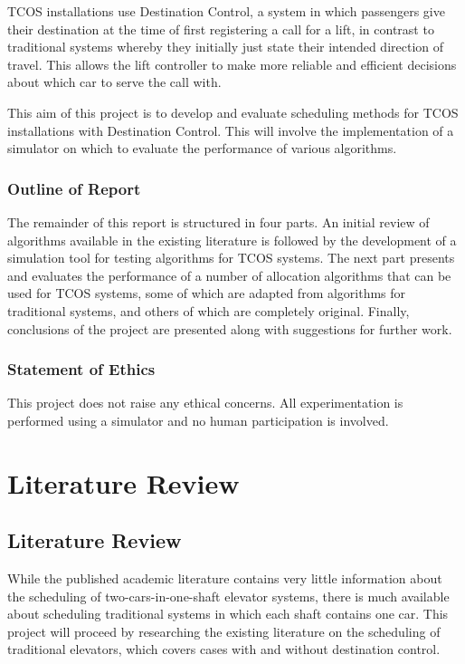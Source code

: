 \documentclass{UoYCSproject}
\begin{document}
TCOS installations use Destination Control, a system in which passengers give their destination at the time of first registering a call for a lift, in contrast to traditional systems whereby they initially just state their intended direction of travel.  This allows the lift controller to make more reliable and efficient decisions about which car to serve the call with.

This aim of this project is to develop and evaluate scheduling methods for TCOS installations with Destination Control.  This will involve the implementation of a simulator on which to evaluate the performance of various algorithms.

\section{Outline of Report}

The remainder of this report is structured in four parts.  An initial review of algorithms available in the existing literature is followed by the development of a simulation tool for testing algorithms for TCOS systems.  The next part presents and evaluates the performance of a number of allocation algorithms that can be used for TCOS systems, some of which are adapted from algorithms for traditional systems, and others of which are completely original.  Finally, conclusions of the project are presented along with suggestions for further work.

\section{Statement of Ethics}

This project does not raise any ethical concerns.  All experimentation is performed using a simulator and no human participation is involved.

\part{Literature Review}

\chapter{Literature Review}

While the published academic literature contains very little information about the scheduling of two-cars-in-one-shaft elevator systems, there is much available about scheduling traditional systems in which each shaft contains one car.  This project will proceed by researching the existing literature on the scheduling of traditional elevators, which covers cases with and without destination control.
\end{document}
